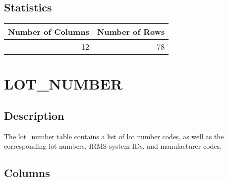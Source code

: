 \documentclass[
  letterpaper,
  DIV=11,
  numbers=noendperiod]{scrreprt}
\begin{document}
\hypertarget{statistics-18}{%
\section*{Statistics}\label{statistics-18}}

\begin{longtable}{rr}
\toprule
Number of Columns & Number of Rows \\ 
\midrule
12 & 78 \\ 
\bottomrule
\end{longtable}

\hypertarget{lot_number}{%
\chapter*{LOT\_NUMBER}\label{lot_number}}

\hypertarget{description-19}{%
\section*{Description}\label{description-19}}

The lot\_number table contains a list of lot number codes, as well as
the corresponding lot numbers, IRMS system IDs, and manufacturer codes.

\hypertarget{columns-19}{%
\section*{Columns}\label{columns-19}}
\end{document}
